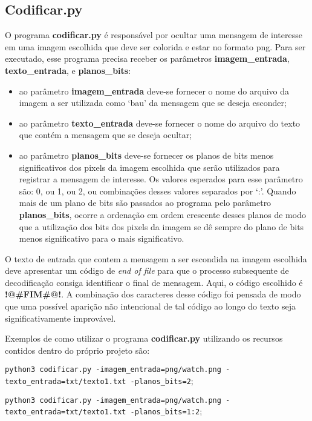 \documentclass{article}
\begin{document}
\subsection{Codificar.py}
O programa \textbf{codificar.py} é responsável por ocultar uma mensagem de interesse em uma imagem escolhida que deve ser colorida e estar no formato png. Para ser executado, esse programa precisa receber os parâmetros \textbf{imagem\_entrada}, \textbf{texto\_entrada}, e \textbf{planos\_bits}:


\begin{itemize}
	\item ao parâmetro \textbf{imagem\_entrada} deve-se fornecer o nome do arquivo da imagem a ser utilizada como `bau' da mensagem que se deseja esconder;
	\item ao parâmetro \textbf{texto\_entrada} deve-se fornecer o nome do arquivo do texto que contém a mensagem que
	se deseja ocultar;
	\item ao parâmetro \textbf{planos\_bits} deve-se fornecer os planos de bits menos significativos dos pixels da imagem escolhida que serão utilizados para registrar a mensagem de interesse. Os valores esperados para esse parâmetro são: 0, ou 1, ou 2, ou combinações desses valores separados por ‘:’. Quando mais de um plano de bits são passados ao programa pelo parâmetro \textbf{planos\_bits}, ocorre a ordenação em ordem crescente desses planos de modo que a utilização dos bits dos pixels da imagem se dê sempre do plano de bits menos significativo para o mais significativo.
\end{itemize}

\noindent
O texto de entrada que contem a mensagem a ser escondida na imagem escolhida deve apresentar um código de \textit{end of file} para que o processo subsequente de decodificação consiga identificar o final de mensagem. Aqui, o código escolhido é \textbf{!@\#FIM\#@!}. A combinação dos caracteres desse código foi pensada de modo que uma possível aparição não intencional de tal código ao longo do texto seja significativamente improvável.

Exemplos de como utilizar o programa \textbf{codificar.py} utilizando os recursos contidos dentro do próprio projeto são:

\lstinline{python3 codificar.py -imagem_entrada=png/watch.png -texto_entrada=txt/texto1.txt -planos_bits=2};

\lstinline{python3 codificar.py -imagem_entrada=png/watch.png -texto_entrada=txt/texto1.txt -planos_bits=1:2};
\end{document}
